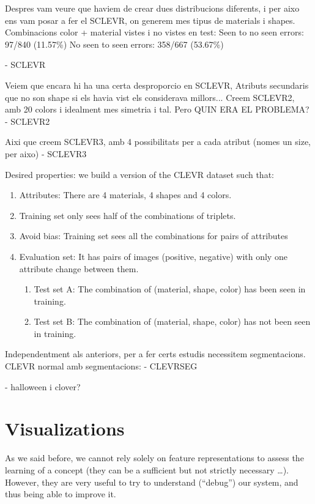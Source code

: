 Despres vam veure que haviem de crear dues distribucions diferents, i per aixo ens vam posar a fer el SCLEVR, on generem mes tipus de materials i shapes.
Combinacions color + material vistes i no vistes en test:
Seen to no seen errors: 97/840 (11.57\%)
No seen to seen errors: 358/667 (53.67\%)

- SCLEVR



Veiem que encara hi ha una certa desproporcio en SCLEVR, Atributs secundaris que no son shape si els havia vist els considerava millors... Creem SCLEVR2, amb 20 colors i idealment mes simetria i tal. Pero QUIN ERA EL PROBLEMA?
- SCLEVR2

Aixi que creem SCLEVR3, amb 4 possibilitats per a cada atribut (nomes un size, per aixo)
- SCLEVR3

Desired  properties:  we  build  a  version  of  the  CLEVR  dataset  such  that:  
\begin{enumerate}
    \item Attributes:  There  are  4  materials,  4  shapes  and  4  colors.  \item Training  set  only  sees  half  of  the  combinations  of  triplets. \item Avoid  bias:  Training  set  sees  all  the  combinations  for  pairs  of  attributes  
    \item Evaluation  set:  It  has  pairs  of  images  (positive,  negative)  with  only  one  attribute  change  between  them.  
    \begin{enumerate}
        \item Test  set  A:  The  combination  of  (material,  shape,  color)  has  been  seen  in  training.  
        \item Test  set  B:  The  combination  of  (material,  shape,  color)  has  not  been  seen  in  training. 
    \end{enumerate}
\end{enumerate}



Independentment als anteriors, per a fer certs estudis necessitem segmentacions. CLEVR normal amb segmentacions:
- CLEVRSEG

- halloween i clover?


\section{Visualizations}

As we said before, we cannot rely solely on feature representations to assess the learning of a concept (they can be a sufficient but not strictly necessary …). However, they are very useful to try to understand (“debug”) our system, and thus being able to improve it. 

